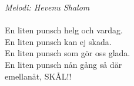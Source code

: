 {\footnotesize\textit{Melodi: Hevenu Shalom}}\\
\\
En liten punsch helg och vardag.\\
En liten punsch kan ej skada.\\
En liten punsch som gör oss glada.\\
En liten punsch nån gång så där\\
emellanåt, SKÅL!!
